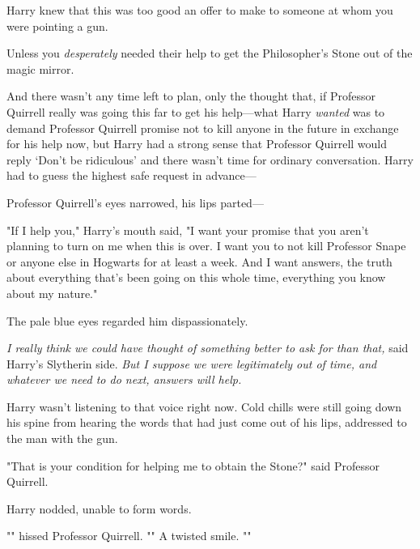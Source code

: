 Harry knew that this was too good an offer to make to someone at whom you were
pointing a gun.

Unless you \emph{desperately} needed their help to get the Philosopher's Stone
out of the magic mirror.

And there wasn't any time left to plan, only the thought that, if Professor
Quirrell really was going this far to get his help---what Harry \emph{wanted}
was to demand Professor Quirrell promise not to kill anyone in the future in
exchange for his help now, but Harry had a strong sense that Professor Quirrell
would reply `Don't be ridiculous' and there wasn't time for ordinary
conversation. Harry had to guess the highest safe request in advance---

Professor Quirrell's eyes narrowed, his lips parted---

"If I help you," Harry's mouth said, "I want your promise that you aren't
planning to turn on me when this is over. I want you to not kill Professor
Snape or anyone else in Hogwarts for at least a week. And I want answers, the
truth about everything that's been going on this whole time, everything you
know about my nature."

The pale blue eyes regarded him dispassionately.

\emph{I really think we could have thought of something better to ask for than
that,} said Harry's Slytherin side. \emph{But I suppose we were legitimately
out of time, and whatever we need to do next, answers will help.}

Harry wasn't listening to that voice right now. Cold chills were still going
down his spine from hearing the words that had just come out of his lips,
addressed to the man with the gun.

"That is your condition for helping me to obtain the Stone?" said Professor
Quirrell.

Harry nodded, unable to form words.

"" hissed Professor Quirrell. "" A twisted smile.
""

